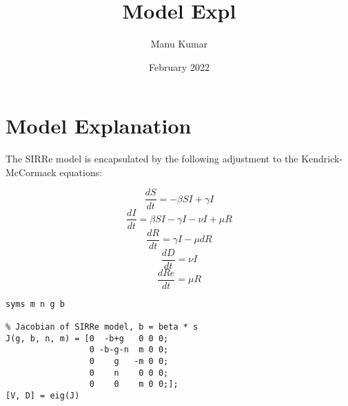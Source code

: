 \documentclass{article}
\title{Model Expl}
\author{Manu Kumar}
\date{February 2022}
\begin{document}
\section{Model Explanation}

The SIRRe model is encapsulated by the following adjustment to the Kendrick-McCormack equations:

$$ \frac{dS}{dt} = - \beta SI + \gamma I $$
$$ \frac{dI}{dt} = \beta SI - \gamma I - \nu I + \mu R $$
$$ \frac{dR}{dt} = \gamma I - \mu dR $$
$$ \frac{dD}{dt} = \nu I $$
$$ \frac{dRe}{dt} = \mu R $$

\begin{verbatim}
syms m n g b

% Jacobian of SIRRe model, b = beta * s
J(g, b, n, m) = [0  -b+g   0 0 0;
                 0 -b-g-n  m 0 0;
                 0    g   -m 0 0;
                 0    n    0 0 0;
                 0    0    m 0 0;];
[V, D] = eig(J)
\end{verbatim}
\end{document}
